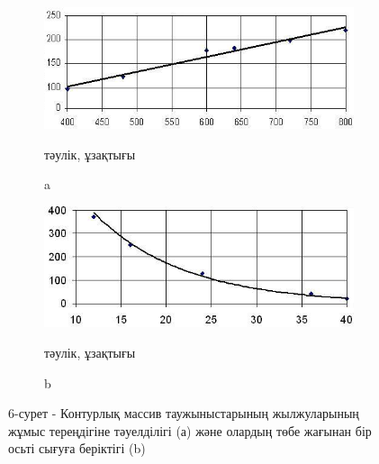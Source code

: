 \begin{figure}[H]
    \centering
    \begin{subfigure}[b]{0.45\textwidth}
        \centering
        \includegraphics[width=\linewidth]{assets/1337}
		\caption*{тәулік, ұзақтығы}
		\caption*{a}
    \end{subfigure}
    \hfill
    \begin{subfigure}[b]{0.45\textwidth}
        \centering
        \includegraphics[width=\linewidth]{assets/1338}
		\caption*{тәулік, ұзақтығы}
		\caption*{b}
    \end{subfigure}
  \caption*{6-сурет - Контурлық массив таужыныстарының жылжуларының жұмыс тереңдігіне тәуелділігі (а) және олардың төбе жағынан бір осьті сығуға беріктігі (b)}
\end{figure}

